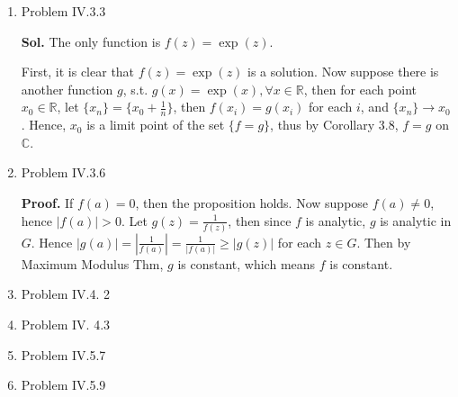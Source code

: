 \documentclass{article}%
\begin{document}
\begin{enumerate}
\item Problem IV.3.3

\textbf{Sol.}
The only function is $f(z) = \exp(z)$. 

First, it is clear that $f(z) = \exp(z)$ is a solution. Now suppose there is another function $g$, s.t. $g(x) = \exp(x), \forall x\in\mathbb{R}$, then for each point $x_0\in\mathbb{R} $, let $\{x_n\} = \{x_0 + \frac{1}{n}\}$, then $f(x_i) = g(x_i)$ for each $i$, and $\{x_n\}\to x_0 $. Hence, $x_0 $ is a limit point of the set $\{f = g\}$, thus by Corollary 3.8, $f = g$ on $\mathbb{C}$.

\item Problem IV.3.6

\textbf{Proof.} If $f(a) = 0$, then the proposition holds. Now suppose $f(a) \ne 0$, hence $|f(a)| > 0$. Let $g(z) = \frac{1}{f(z)}$, then since $f$ is analytic, $g$ is analytic in $G$. Hence $|g(a)| = \left|\frac{1}{f(a)}\right| = \frac{1}{|f(a)|} \ge |g(z)|$ for each $z\in G$. Then by Maximum Modulus Thm, $g$ is constant, which means $f$ is constant.

\item Problem IV.4. 2

\item Problem IV. 4.3

\item Problem IV.5.7

\item Problem IV.5.9


\end{enumerate}
\end{document}
